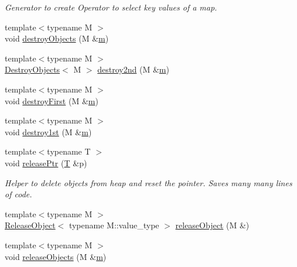 \begin{DoxyCompactItemize}
\begin{DoxyCompactList}\small\item\em Generator to create Operator to select key values of a map. \end{DoxyCompactList}\item 
{\footnotesize template$<$typename M $>$ }\\void \hyperlink{namespace_d_d4hep_ae239c6d3c17def89a9b82c1ea27a9fd7}{destroy\+Objects} (M \&\hyperlink{_volumes_8cpp_a6fc379aaec47ce424b00d8ffda2a6c59}{m})
\item 
{\footnotesize template$<$typename M $>$ }\\\hyperlink{class_d_d4hep_1_1_destroy_objects}{Destroy\+Objects}$<$ M $>$ \hyperlink{namespace_d_d4hep_a81661ef6868ba17c006826cace56f4aa}{destroy2nd} (M \&\hyperlink{_volumes_8cpp_a6fc379aaec47ce424b00d8ffda2a6c59}{m})
\item 
{\footnotesize template$<$typename M $>$ }\\void \hyperlink{namespace_d_d4hep_affba2c49c016cc41716f1d6a020064bf}{destroy\+First} (M \&\hyperlink{_volumes_8cpp_a6fc379aaec47ce424b00d8ffda2a6c59}{m})
\item 
{\footnotesize template$<$typename M $>$ }\\void \hyperlink{namespace_d_d4hep_ad97ecff6ba06daf5d6dc7225dfad6361}{destroy1st} (M \&\hyperlink{_volumes_8cpp_a6fc379aaec47ce424b00d8ffda2a6c59}{m})
\item 
{\footnotesize template$<$typename T $>$ }\\void \hyperlink{namespace_d_d4hep_a80530363d2dcb2990f1ebacbfb69b789}{release\+Ptr} (\hyperlink{class_t}{T} \&p)
\begin{DoxyCompactList}\small\item\em Helper to delete objects from heap and reset the pointer. Saves many many lines of code. \end{DoxyCompactList}\item 
{\footnotesize template$<$typename M $>$ }\\\hyperlink{class_d_d4hep_1_1_release_object}{Release\+Object}$<$ typename M\+::value\+\_\+type $>$ \hyperlink{namespace_d_d4hep_a22ef55856c463708ea72a02dcca99fc1}{release\+Object} (M \&)
\item 
{\footnotesize template$<$typename M $>$ }\\void \hyperlink{namespace_d_d4hep_af72014aac51cad36a418913e989a34fe}{release\+Objects} (M \&\hyperlink{_volumes_8cpp_a6fc379aaec47ce424b00d8ffda2a6c59}{m})
\item 

\end{DoxyCompactItemize}
